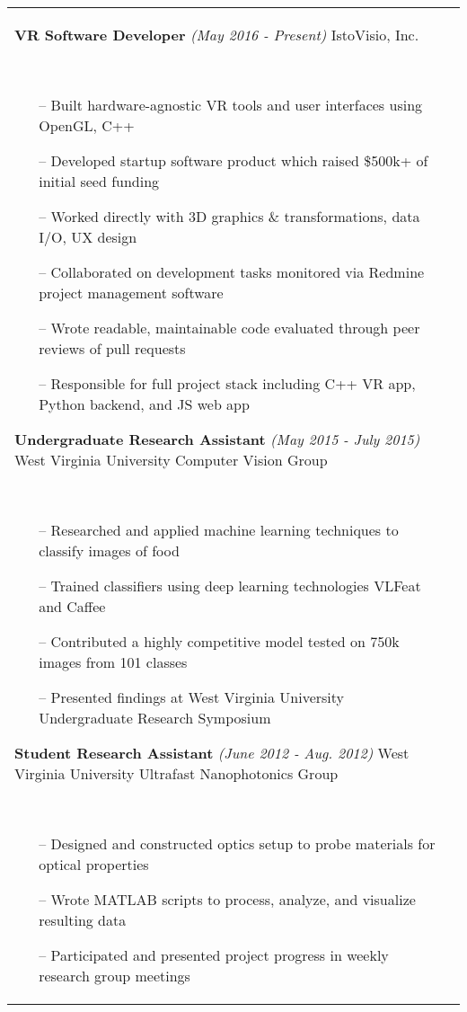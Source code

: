 \documentclass{article}
\begin{document}
\begin{tabular}{@{}p{2.5cm}@{\hspace{0.2cm}}p{13cm}@{}}
\textbf{VR Software Developer}
\hfill\small\textit{(May 2016 - Present)}\normalsize
\newline IstoVisio, Inc.
\par\,\small
\begin{itemize}[leftmargin=*,nolistsep,noitemsep]
  \item[--]Built hardware-agnostic VR tools and user interfaces using OpenGL, C++
  \item[--]Developed startup software product which raised \$500k+ of initial seed funding
	\item[--]Worked directly with 3D graphics \& transformations, data I/O, UX design
	\item[--]Collaborated on development tasks monitored via Redmine project management software
	\item[--]Wrote readable, maintainable code evaluated through peer reviews of pull requests
	\item[--]Responsible for full project stack including C++ VR app, Python backend, and JS web app
\newline
\end{itemize}
\normalsize

\textbf{Undergraduate Research Assistant}
\hfill\small\textit{(May 2015 - July 2015)}\normalsize
\newline West Virginia University Computer Vision Group
\par\,\small
\begin{itemize}[leftmargin=*,nolistsep,noitemsep]
  \item[--]Researched and applied machine learning techniques to classify images of food
  \item[--]Trained classifiers using deep learning technologies VLFeat and Caffee
  \item[--]Contributed a highly competitive model tested on 750k images from 101 classes
	\item[--]Presented findings at West Virginia University Undergraduate Research Symposium
\newline
\end{itemize}
\normalsize

\textbf{Student Research Assistant}
\hfill\small\textit{(June 2012 - Aug. 2012)}\normalsize
\newline West Virginia University Ultrafast Nanophotonics Group
\par\,\small
\begin{itemize}[leftmargin=*, nolistsep,noitemsep]
  \item[--]Designed and constructed optics setup to probe materials for optical properties
  \item[--]Wrote MATLAB scripts to process, analyze, and visualize resulting data
	\item[--]Participated and presented project progress in weekly research group meetings
\end{itemize}
\normalsize \\


\end{tabular}
\end{document}
